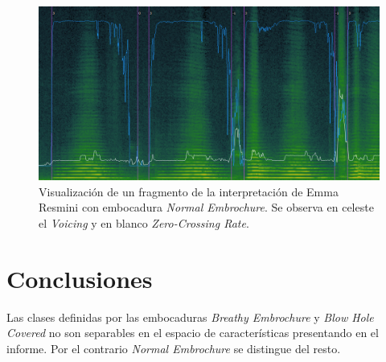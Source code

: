 \documentclass{article}
\begin{document}
\begin{figure}[H]
\begin{center}
\includegraphics[width=1\textwidth]{normalemb_features} 
\caption{Visualización de un fragmento de la interpretación de Emma Resmini con embocadura \textit{Normal Embrochure}. Se observa en celeste el \textit{Voicing} y en blanco \textit{Zero-Crossing Rate}.}
\label{fig:normalemb_features}
\end{center}
\end{figure}

\section*{Conclusiones}

Las clases definidas por las embocaduras \textit{Breathy Embrochure} y \textit{Blow Hole Covered} no son separables en el espacio de características presentando en el informe. Por el contrario \textit{Normal Embrochure} se distingue del resto.  



\newpage




\end{document}
